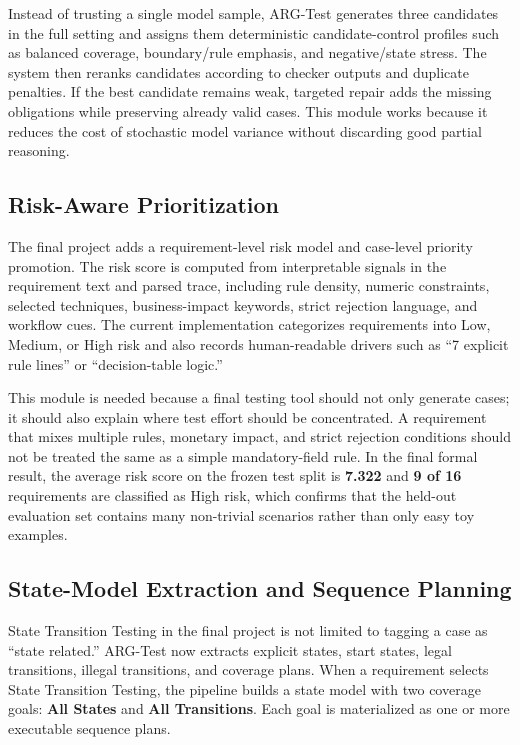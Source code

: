 \documentclass{article}
\begin{document}
Instead of trusting a single model sample, ARG-Test generates three candidates in the full setting and assigns them deterministic candidate-control profiles such as balanced coverage, boundary/rule emphasis, and negative/state stress. The system then reranks candidates according to checker outputs and duplicate penalties. If the best candidate remains weak, targeted repair adds the missing obligations while preserving already valid cases. This module works because it reduces the cost of stochastic model variance without discarding good partial reasoning.

\subsection{Risk-Aware Prioritization}
The final project adds a requirement-level risk model and case-level priority promotion. The risk score is computed from interpretable signals in the requirement text and parsed trace, including rule density, numeric constraints, selected techniques, business-impact keywords, strict rejection language, and workflow cues. The current implementation categorizes requirements into Low, Medium, or High risk and also records human-readable drivers such as ``7 explicit rule lines'' or ``decision-table logic.''

This module is needed because a final testing tool should not only generate cases; it should also explain where test effort should be concentrated. A requirement that mixes multiple rules, monetary impact, and strict rejection conditions should not be treated the same as a simple mandatory-field rule. In the final formal result, the average risk score on the frozen test split is \textbf{7.322} and \textbf{9 of 16} requirements are classified as High risk, which confirms that the held-out evaluation set contains many non-trivial scenarios rather than only easy toy examples.

\subsection{State-Model Extraction and Sequence Planning}
State Transition Testing in the final project is not limited to tagging a case as ``state related.'' ARG-Test now extracts explicit states, start states, legal transitions, illegal transitions, and coverage plans. When a requirement selects State Transition Testing, the pipeline builds a state model with two coverage goals: \textbf{All States} and \textbf{All Transitions}. Each goal is materialized as one or more executable sequence plans.
\end{document}
